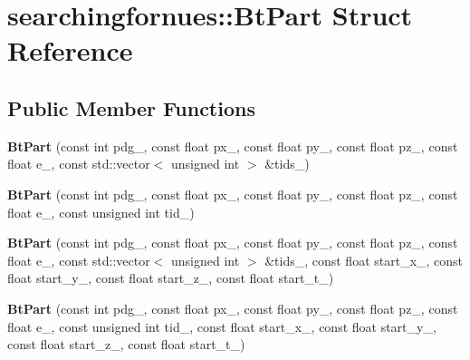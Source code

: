 \hypertarget{structsearchingfornues_1_1BtPart}{}\section{searchingfornues\+:\+:Bt\+Part Struct Reference}
\label{structsearchingfornues_1_1BtPart}
\subsection*{Public Member Functions}
\begin{DoxyCompactItemize}
\item 
{\bfseries Bt\+Part} (const int pdg\+\_\+, const float px\+\_\+, const float py\+\_\+, const float pz\+\_\+, const float e\+\_\+, const std\+::vector$<$ unsigned int $>$ \&tids\+\_\+)\hypertarget{structsearchingfornues_1_1BtPart_a00003f0908892d8a64f80a8b3f2e6f90}{}\label{structsearchingfornues_1_1BtPart_a00003f0908892d8a64f80a8b3f2e6f90}

\item 
{\bfseries Bt\+Part} (const int pdg\+\_\+, const float px\+\_\+, const float py\+\_\+, const float pz\+\_\+, const float e\+\_\+, const unsigned int tid\+\_\+)\hypertarget{structsearchingfornues_1_1BtPart_a69048423846c19666791da82138ce613}{}\label{structsearchingfornues_1_1BtPart_a69048423846c19666791da82138ce613}

\item 
{\bfseries Bt\+Part} (const int pdg\+\_\+, const float px\+\_\+, const float py\+\_\+, const float pz\+\_\+, const float e\+\_\+, const std\+::vector$<$ unsigned int $>$ \&tids\+\_\+, const float start\+\_\+x\+\_\+, const float start\+\_\+y\+\_\+, const float start\+\_\+z\+\_\+, const float start\+\_\+t\+\_\+)\hypertarget{structsearchingfornues_1_1BtPart_a558eabb4a0b1bf1b67f7652feb5b2c7d}{}\label{structsearchingfornues_1_1BtPart_a558eabb4a0b1bf1b67f7652feb5b2c7d}

\item 
{\bfseries Bt\+Part} (const int pdg\+\_\+, const float px\+\_\+, const float py\+\_\+, const float pz\+\_\+, const float e\+\_\+, const unsigned int tid\+\_\+, const float start\+\_\+x\+\_\+, const float start\+\_\+y\+\_\+, const float start\+\_\+z\+\_\+, const float start\+\_\+t\+\_\+)\hypertarget{structsearchingfornues_1_1BtPart_add22892f64dd5657a0dbe194bc7234aa}{}\label{structsearchingfornues_1_1BtPart_add22892f64dd5657a0dbe194bc7234aa}

\end{DoxyCompactItemize}
